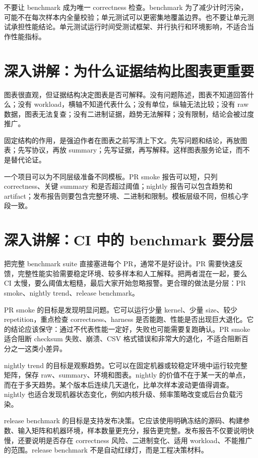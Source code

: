 不要让 benchmark 成为唯一 correctness 检查。benchmark 为了减少计时污染，可能不在每次样本内全量校验；单元测试可以更密集地覆盖边界。也不要让单元测试承担性能结论。单元测试运行时间受测试框架、并行执行和环境影响，不适合当作性能指标。

\section{深入讲解：为什么证据结构比图表更重要}

图表很直观，但证据结构决定图表是否可解释。没有问题陈述，图表不知道回答什么；没有 workload，横轴不知道代表什么；没有单位，纵轴无法比较；没有 raw 数据，图表无法复查；没有二进制证据，趋势无法解释；没有限制，结论会被过度推广。

固定结构的作用，是强迫作者在图表之前写清上下文。先写问题和结论，再放图表；先写协议，再放 summary；先写证据，再写解释。这样图表服务论证，而不是替代论证。

一个项目可以为不同层级准备不同模板。PR smoke 报告可以短，只列 correctness、关键 summary 和是否超过阈值；nightly 报告可以包含趋势和 artifact；发布报告则要包含完整环境、二进制和限制。模板层级不同，但核心字段一致。

\section{深入讲解：CI 中的 benchmark 要分层}

把完整 benchmark suite 直接塞进每个 PR，通常不是好设计。PR 需要快速反馈，完整性能实验需要稳定环境、较多样本和人工解释。把两者混在一起，要么 CI 太慢，要么阈值太粗糙，最后大家开始忽略报警。更合理的做法是分层：PR smoke、nightly trend、release benchmark。

PR smoke 的目标是发现明显问题。它可以运行少量 kernel、少量 size、较少 repetition，重点检查 correctness、harness 是否能跑、性能是否出现巨大退化。它的结论应该保守：通过不代表性能一定好，失败也可能需要复跑确认。PR smoke 适合阻断 checksum 失败、崩溃、CSV 格式错误和非常大的退化，不适合阻断百分之一这类小差异。

nightly trend 的目标是观察趋势。它可以在固定机器或较稳定环境中运行较完整矩阵，保存 raw、summary、环境和图表。nightly 的价值不在于某一天的单点，而在于多天趋势。某个版本后连续几天退化，比单次样本波动更值得调查。nightly 也适合发现机器状态变化，例如内核升级、频率策略改变或后台负载污染。

release benchmark 的目标是支持发布决策。它应该使用明确冻结的源码、构建参数、输入矩阵和机器环境，样本数量更充分，报告更完整。发布报告不仅要说明快慢，还要说明是否存在 correctness 风险、二进制变化、适用 workload、不能推广的范围。release benchmark 不是自动红绿灯，而是工程决策材料。

